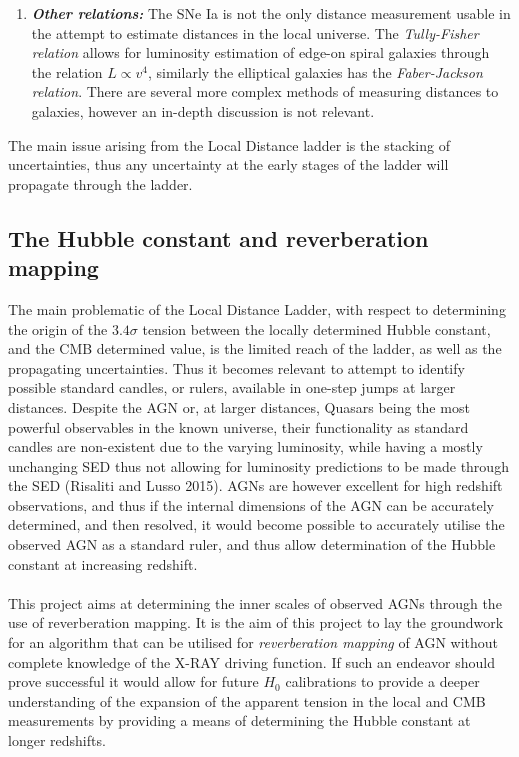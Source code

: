 \documentclass[a4paper, 12pt, twoside]{article}
\begin{document}
\begin{enumerate}
\item {\bf \emph{Other relations:}} The SNe Ia is not the only distance measurement usable in the attempt to estimate distances in the local universe. The \emph{Tully-Fisher relation} allows for luminosity estimation of edge-on spiral galaxies through the relation $L \propto v^{4}$, similarly the elliptical galaxies has the \emph{Faber-Jackson relation}. There are several more complex methods of measuring distances to galaxies, however an in-depth discussion is not relevant.  
\end{enumerate}
The main issue arising from the Local Distance ladder is the stacking of uncertainties, thus any uncertainty at the early stages of the ladder will propagate through the ladder. 

\subsection[The Hubble constant and reverberation mapping]{The Hubble constant and reverberation mapping}
The main problematic of the Local Distance Ladder, with respect to determining the origin of the $3.4\sigma$ tension between the locally determined Hubble constant, and the CMB determined value, is the limited reach of the ladder, as well as the propagating uncertainties. Thus it becomes relevant to attempt to identify possible standard candles, or rulers, available in one-step jumps at larger distances. Despite the AGN or, at larger distances, Quasars being the most powerful observables in the known universe, their functionality as standard candles are non-existent due to the varying luminosity, while having a mostly unchanging SED thus not allowing for luminosity predictions to be made through the SED (Risaliti and Lusso 2015). AGNs are however excellent for high redshift observations, and thus if the internal dimensions of the AGN can be accurately determined, and then resolved, it would become possible to accurately utilise the observed AGN as a standard ruler, and thus allow determination of the Hubble constant at increasing redshift. \\
\\
This project aims at determining the inner scales of observed AGNs through the use of reverberation mapping. It is the aim of this project to lay the groundwork for an algorithm that can be utilised for \emph{reverberation mapping} of AGN without complete knowledge of the X-RAY driving function. If such an endeavor should prove successful it would allow for future $H_{0}$ calibrations to provide a deeper understanding of the expansion of the apparent tension in the local and CMB measurements by providing a means of determining the Hubble constant at longer redshifts. 
\end{document}
